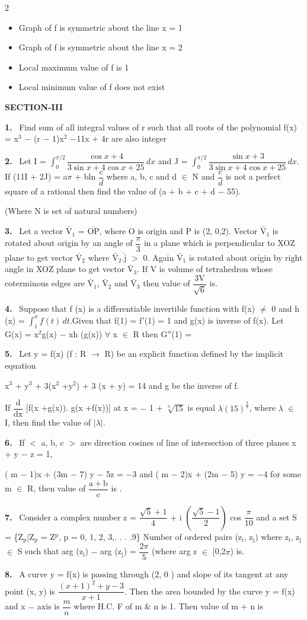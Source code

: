 \documentclass[10pt]{extarticle}
\newcommand{\sect}[1]{\par\smallskip\noindent\textbf{#1}\par}
\newcommand{\qn}[1]{\par\smallskip\noindent\textbf{#1.}~}
\newenvironment{qoptions}{\begin{itemize}[leftmargin=1.8em,itemsep=1pt,topsep=2pt,label={}]}{\end{itemize}}
\newcommand{\opt}[2]{\item[(#1)] #2}
\begin{document}
\begin{multicols}{2}
\begin{qoptions}
\opt{A}{Graph of f is symmetric about the line x = 1}
\opt{B}{Graph of f is symmetric about the line x = 2}
\opt{C}{Local maximum value of f is 1}
\opt{D}{Local minimum value of f does not exist}
\end{qoptions}
\sect{SECTION-III}
\qn{1} Find sum of all integral values of r such that all roots of the polynomial f(x) = x$^3$ $-$ (r $-$ 1)x$^2$ $-$11x + 4r are also integer
\qn{2} Let I = $\displaystyle\int_0^{\pi/2}\dfrac{\cos x+4}{3\sin x+4\cos x+25}\,dx$ and J = $\displaystyle\int_0^{\pi/2}\dfrac{\sin x+3}{3\sin x+4\cos x+25}\,dx$. If (11I + 2J) = a$\pi$ + bln $\dfrac cd$ where a, b, c and d $\in$ N and $\dfrac cd$ is not a perfect square of a rational then find the value of (a + b + c + d $-$ 55).\par
(Where N is set of natural numbers)
\qn{3} Let a vector $\bar{\mathrm V}_1$ = $\overline{\mathrm{OP}}$, where O is origin and P is (2, 0,2). Vector $\bar{\mathrm V}_1$ is rotated about origin by an angle of $\dfrac\pi3$ in a plane which is perpendicular to XOZ plane to get vector $\bar{\mathrm V}_2$ where $\bar{\mathrm V}_2$.$\hat{\mathrm j}$ $>$ 0. Again $\bar{\mathrm V}_1$ is rotated about origin by right angle in XOZ plane to get vector $\bar{\mathrm V}_3$. If V is volume of tetrahedron whose coterminous edges are $\bar{\mathrm V}_1$, $\bar{\mathrm V}_2$ and $\bar{\mathrm V}_3$ then value of $\dfrac{3\mathrm V}{\sqrt6}$ is.
\qn{4} Suppose that f (x) is a differentiable invertible function with f(x) $\ne$ 0 and h (x) = $\displaystyle\int_1^xf(t)\,dt$.Given that f(1) = f$'$(1) = 1 and g(x) is inverse of f(x). Let G(x) = x$^2$g(x) $-$ xh (g(x)) $\forall$ x $\in$ R then G$''$(1) =
\qn{5} Let y = f(x) (f : R $\rightarrow$ R) be an explicit function defined by the implicit equation\par
x$^3$ + y$^3$ + 3(x$^2$ +y$^2$) + 3 (x + y) = 14 and g be the inverse of f.\par
If $\dfrac{\mathrm d}{\mathrm{dx}}$ [f(x +g(x)). g(x +f(x))] at x = $-$ 1 + $\sqrt[3]{15}$ is equal $\lambda(15)^{\frac23}$, where $\lambda$ $\in$ I, then find the value of $|\lambda|$.
\qn{6} If $<$ a, b, c $>$ are direction cosines of line of intersection of three planes x + y $-$ z = 1,\par
( m $-$ 1)x + (3m $-$ 7) y $-$ 5z = $-$3 and ( m $-$ 2)x + (2m $-$ 5) y = $-$4 for some m $\in$ R, then value of $\dfrac{\mathrm a+\mathrm b}{\mathrm c}$ is \underline{\hspace{1cm}}.
\qn{7} Consider a complex number z = $\dfrac{\sqrt5+1}4$ + i $\left(\dfrac{\sqrt5-1}2\right)$ cos $\dfrac\pi{10}$ and a set S = \{Z$_\mathrm p$$|$Z$_\mathrm p$ = Z$^\mathrm p$, p = 0, 1, 2, 3,. . . .9\} Number of ordered pairs (z$_\mathrm i$, z$_\mathrm j$) where z$_\mathrm i$, z$_\mathrm j$ $\in$ S such that arg (z$_\mathrm i$) $-$ arg (z$_\mathrm j$) = $\dfrac{2\pi}5$ (where arg z $\in$ [0,2$\pi$) is.
\qn{8} A curve y = f(x) is passing through (2, 0 ) and slope of its tangent at any point (x, y) is $\dfrac{(x+1)^2+y-3}{x+1}$. Then the area bounded by the curve y = f(x) and x $-$ axis is $\dfrac mn$ where H.C. F of m \& n is 1. Then value of m + n is
\end{multicols}
\end{document}
